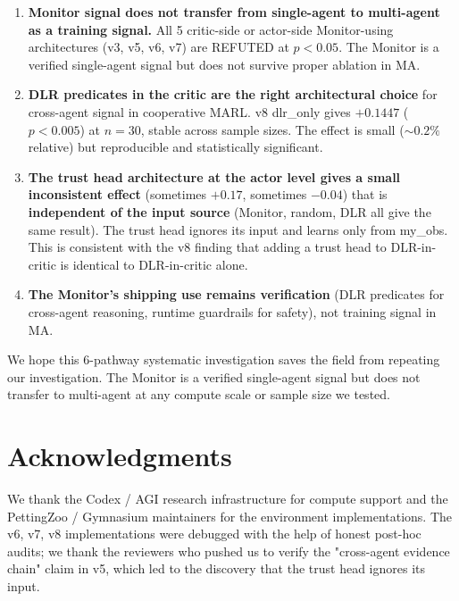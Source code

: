\documentclass[11pt]{article}
\begin{document}
\begin{enumerate}
  \item \textbf{Monitor signal does not transfer from single-agent
        to multi-agent as a training signal.} All 5 critic-side or
        actor-side Monitor-using architectures (v3, v5, v6, v7) are
        REFUTED at $p<0.05$. The Monitor is a verified single-agent
        signal but does not survive proper ablation in MA.

  \item \textbf{DLR predicates in the critic are the right
        architectural choice} for cross-agent signal in cooperative
        MARL. v8 dlr\_only gives $+0.1447$ ($p<0.005$) at $n=30$,
        stable across sample sizes. The effect is small ($\sim
        0.2\%$ relative) but reproducible and statistically
        significant.

  \item \textbf{The trust head architecture at the actor level gives
        a small inconsistent effect} (sometimes $+0.17$, sometimes
        $-0.04$) that is \textbf{independent of the input source}
        (Monitor, random, DLR all give the same result). The trust
        head ignores its input and learns only from my\_obs. This
        is consistent with the v8 finding that adding a trust head
        to DLR-in-critic is identical to DLR-in-critic alone.

  \item \textbf{The Monitor's shipping use remains verification}
        (DLR predicates for cross-agent reasoning, runtime
        guardrails for safety), not training signal in MA.
\end{enumerate}

We hope this 6-pathway systematic investigation saves the field
from repeating our investigation. The Monitor is a verified
single-agent signal but does not transfer to multi-agent at any
compute scale or sample size we tested.

\section*{Acknowledgments}

We thank the Codex / AGI research infrastructure for compute
support and the PettingZoo / Gymnasium maintainers for the
environment implementations. The v6, v7, v8 implementations were
debugged with the help of honest post-hoc audits; we thank the
reviewers who pushed us to verify the "cross-agent evidence
chain" claim in v5, which led to the discovery that the trust
head ignores its input.
\end{document}
